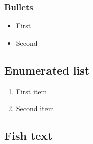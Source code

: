\subsubsection{Bullets}

\begin{itemize}
	\item First
	\item Second
\end{itemize}

\subsection{Enumerated list}
\begin{enumerate}
	\item First item
	\item Second item
\end{enumerate}

\subsection{Fish text}
\lipsum